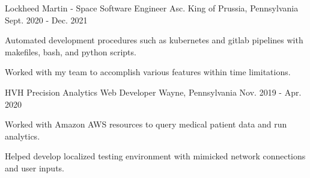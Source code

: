 \begin{cventries}

  \cventry
    {Lockheed Martin - Space} %
    {Software Engineer Asc.} %
    {King of Prussia, Pennsylvania} %
    {Sept. 2020 - Dec. 2021} %
    {
      \begin{cvitems} %
        \item {Automated development procedures such as kubernetes and gitlab pipelines with makefiles, bash, and python scripts.}
        \item {Worked with my team to accomplish various features within time limitations.}
      \end{cvitems}
    }

  \cventry
    {HVH Precision Analytics} %
    {Web Developer} %
    {Wayne, Pennsylvania} %
    {Nov. 2019 - Apr. 2020} %
    {
      \begin{cvitems} %
        \item {Worked with Amazon AWS resources to query medical patient data and run analytics.}
        \item {Helped develop localized testing environment with mimicked network connections and user inputs.}
      \end{cvitems}
    }



\end{cventries}
